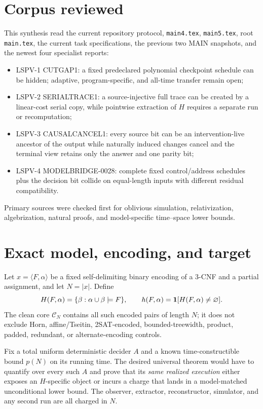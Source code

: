 \documentclass[11pt]{article}
\begin{document}
\section*{Corpus reviewed}
This synthesis read the current repository protocol, \texttt{main4.tex},
\texttt{main5.tex}, root \texttt{main.tex}, the current task specifications,
the previous two MAIN snapshots, and the newest four specialist reports:
\begin{itemize}
\item LSPV-1 \textsf{CUTGAP1}: a fixed predeclared polynomial checkpoint
schedule can be hidden; adaptive, program-specific, and all-time transfer
remain open;
\item LSPV-2 \textsf{SERIALTRACE1}: a source-injective full trace can be
created by a linear-cost serial copy, while pointwise extraction of $H$
requires a separate run or recomputation;
\item LSPV-3 \textsf{CAUSALCANCEL1}: every source bit can be an
intervention-live ancestor of the output while naturally induced changes
cancel and the terminal view retains only the answer and one parity bit;
\item LSPV-4 \textsf{MODELBRIDGE-0028}: complete fixed control/address
schedules plus the decision bit collide on equal-length inputs with different
residual compatibility.
\end{itemize}
Primary sources were checked first for oblivious simulation, relativization,
algebrization, natural proofs, and model-specific time--space lower bounds.

\section*{Exact model, encoding, and target}
Let $x=\langle F,\alpha\rangle$ be a fixed self-delimiting binary encoding of
a 3-CNF and a partial assignment, and let $N=|x|$.  Define
\[
 H(F,\alpha)=\{\beta:\alpha\cup\beta\models F\},\qquad
 h(F,\alpha)={\bf 1}[H(F,\alpha)\ne\varnothing].
\]
The clean core $\mathcal C_N$ contains all such encoded pairs of length $N$;
it does not exclude Horn, affine/Tseitin, 2SAT-encoded,
bounded-treewidth, product, padded, redundant, or alternate-encoding controls.

Fix a total uniform deterministic decider $A$ and a known time-constructible
bound $p(N)$ on its running time.  The desired universal theorem would have to
quantify over every such $A$ and prove that its \emph{same realized execution}
either exposes an $H$-specific object or incurs a charge that lands in a
model-matched unconditional lower bound.  The observer, extractor,
reconstructor, simulator, and any second run are all charged in $N$.
\end{document}
